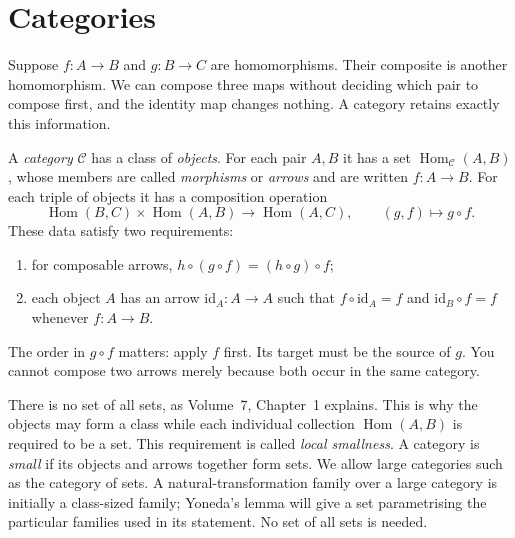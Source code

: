 \section{Categories}

Suppose $f:A\to B$ and $g:B\to C$ are homomorphisms. Their composite is another homomorphism. We can compose three maps without deciding which pair to compose first, and the identity map changes nothing. A category retains exactly this information.

\begin{definition}\label{def:category}
A \emph{category} $\mathcal C$ has a class of \emph{objects}. For each pair $A,B$ it has a set $\operatorname{Hom}_{\mathcal C}(A,B)$, whose members are called \emph{morphisms} or \emph{arrows} and are written $f:A\to B$. For each triple of objects it has a composition operation
\[
\operatorname{Hom}(B,C)\times\operatorname{Hom}(A,B)\longrightarrow\operatorname{Hom}(A,C),\qquad(g,f)\longmapsto g\circ f.
\]
These data satisfy two requirements:
\begin{enumerate}[label=(\roman*)]
\item for composable arrows, $h\circ(g\circ f)=(h\circ g)\circ f$;
\item each object $A$ has an arrow $\mathrm{id}_A:A\to A$ such that $f\circ\mathrm{id}_A=f$ and $\mathrm{id}_B\circ f=f$ whenever $f:A\to B$.
\end{enumerate}
\end{definition}

The order in $g\circ f$ matters: apply $f$ first. Its target must be the source of $g$. You cannot compose two arrows merely because both occur in the same category.

There is no set of all sets, as Volume~7, Chapter~1 explains. This is why the objects may form a class while each individual collection $\operatorname{Hom}(A,B)$ is required to be a set. This requirement is called \emph{local smallness}. A category is \emph{small} if its objects and arrows together form sets. We allow large categories such as the category of sets. A natural-transformation family over a large category is initially a class-sized family; Yoneda's lemma will give a set parametrising the particular families used in its statement. No set of all sets is needed.

